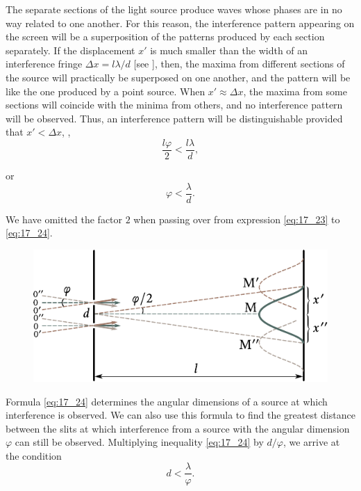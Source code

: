 The separate sections of the light source produce waves whose phases are in no way related to one another.
For this reason, the interference pattern appearing on the screen will be a superposition of the patterns produced by each section separately.
If the displacement $x'$ is much smaller than the width of an interference fringe $\Delta{x}=l\lambda/d$ [see ], then, the maxima from different sections of the source will practically be superposed on one another, and the pattern will be like the one produced by a point source.
When $x'\approx\Delta{x}$, the maxima from some sections will coincide with the minima from others, and no interference pattern will be observed.
Thus, an interference pattern will be distinguishable provided that $x'<\Delta{x}$, \ie,
\begin{equation}\label{eq:17_23}
    \frac{l \varphi}{2} < \frac{l \lambda}{d},
\end{equation}

\noindent
or
\begin{equation}\label{eq:17_24}
    \varphi < \frac{\lambda}{d}.
\end{equation}

\noindent
We have omitted the factor $2$ when passing over from expression \eqref{eq:17_23} to \eqref{eq:17_24}.

\begin{figure}[t]
	\begin{center}
		\includegraphics[scale=1]{figures/ch_17/fig_17_7.pdf}
		\caption[]{}
		\label{fig:17_7}
	\end{center}
	\vspace{-0.9cm}
\end{figure}

Formula \eqref{eq:17_24} determines the angular dimensions of a source at which interference is observed.
We can also use this formula to find the greatest distance between the slits at which interference from a source with the angular dimension $\varphi$ can still be observed.
Multiplying inequality \eqref{eq:17_24} by $d/\varphi$, we arrive at the condition
\begin{equation}\label{eq:17_25}
    d < \frac{\lambda}{\varphi}.
\end{equation}

